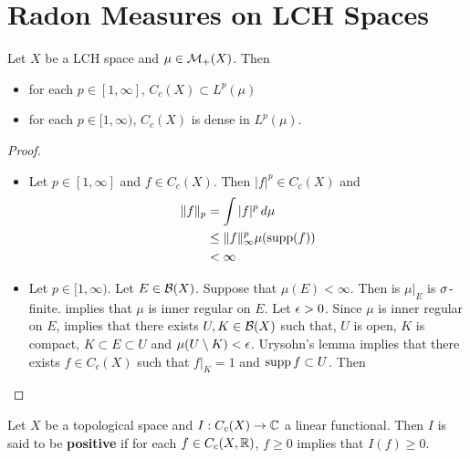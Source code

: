 \documentclass{book}
\begin{document}
	
	
	
	
	
	
	
	
	
	
	
	\newpage	
	\section{Radon Measures on LCH Spaces}
	
	
	\begin{ex}  
		Let $X$ be a LCH space and $\mu \in \mathcal{M}_+(X)$. Then 
		\begin{itemize}
			\item for each $p \in [1, \infty]$, $C_c(X) \subset L^p(\mu)$
			\item for each $p \in [1, \infty)$, $C_c(X)$ is dense in $L^p(\mu)$.
		\end{itemize}
	\end{ex}
	
	\begin{proof}\
		\begin{itemize}
			\item Let $p \in [1, \infty]$ and $f \in C_c(X)$. Then $|f|^p \in C_c(X)$ and 
			\begin{align*}
				\|f\|_p 
				&= \int |f|^p \, d \mu \\
				& \leq \|f\|_{\infty}^p \mu(\operatorname{supp} (f)) \\
				& < \infty
			\end{align*}	 
			\item Let $p \in [1, \infty)$. Let $E \in \mathcal{B}(X)$. Suppose that $\mu(E) < \infty$. Then is $\mu|_E$ is $\sigma$-finite.  implies that $\mu$ is inner regular on $E$. Let $\epsilon > 0$. Since $\mu$ is inner regular on $E$,  implies that there exists $U,K \in \mathcal{B}(X)$ such that, $U$ is open, $K$ is compact, $K \subset E \subset U$ and  $\mu(U \setminus K) < \epsilon$. Urysohn's lemma implies that there exists $f \in C_c(X)$ such that $f|_K = 1$ and $\operatorname{supp} f \subset U$. Then \\
			\tcb{FINISH!!!}
		\end{itemize}
	\end{proof}
	
	\begin{defn}  
	Let $X$ be a topological space and $I: C_c(X) \rightarrow \mathbb{C}$ a linear functional. Then $I$ is said to be \textbf{positive} if for each $f \in C_c(X, \mathbb{R})$, $f \geq 0 $ implies that $I(f) \geq 0$.
	\end{defn}
	
\end{document}

